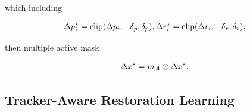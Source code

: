 \documentclass{article}
\begin{document}
	which including

	\begin{equation}
	\label{avg_precision}
	\centering
	\begin{split}
	\Delta p_i^\star = \text{clip}(\Delta p_i, -\delta_p, \delta_p),
	\Delta r_i^\star = \text{clip}(\Delta r_i, -\delta_r, \delta_r),
	\end{split}
	\end{equation}

	then multiple active mask

	\begin{equation}
	\label{avg_precision}
	\centering
	\begin{split}
	\Delta x^\star = m_{\mathcal{A}}\odot \Delta x^\star,
	\end{split}
	\end{equation}

\subsection{Tracker-Aware Restoration Learning}




\end{document}
